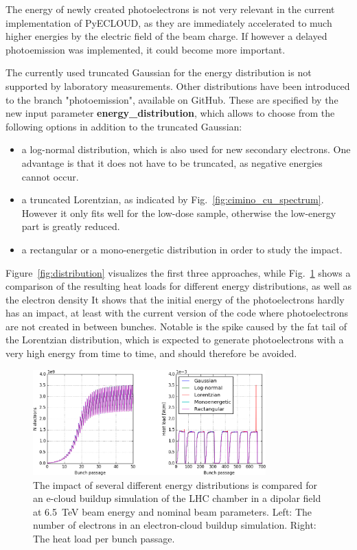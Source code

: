 The energy of newly created photoelectrons is not very relevant in the current implementation of PyECLOUD, as they are immediately accelerated to much higher energies by the electric field of the beam charge.
If however a delayed photoemission was implemented, it could become more important.

The currently used truncated Gaussian for the energy distribution is not supported by laboratory measurements.
Other distributions have been introduced to the branch "photoemission", available on GitHub.
These are specified by the new input parameter \textbf{energy\_distribution}, which allows to choose from the following options in addition to the truncated Gaussian:
\begin{itemize}
    \item a log-normal distribution, which is also used for new secondary electrons.
        One advantage is that it does not have to be truncated, as negative energies cannot occur.
    \item a truncated Lorentzian, as indicated by Fig.~\ref{fig:cimino_cu_spectrum}.
        However it only fits well for the low-dose sample, otherwise the low-energy part is greatly reduced.
    \item a rectangular or a mono-energetic distribution in order to study the impact.
\end{itemize}
Figure~\ref{fig:distribution} visualizes the first three approaches, while Fig.~\ref{fig:test_energy_dist} shows a comparison of the resulting heat loads for different energy distributions, as well as the electron density
It shows that the initial energy of the photoelectrons hardly has an impact, at least with the current version of the code where photoelectrons are not created in between bunches.
Notable is the spike caused by the fat tail of the Lorentzian distribution, which is expected to generate photoelectrons with a very high energy from time to time, and should therefore be avoided.

\begin{figure}[tbh]
    \centering
    \includegraphics[width=0.8\textwidth]{../plots/energy_distribution_impact.png}
    \caption{
        The impact of several different energy distributions is compared for an e-cloud buildup simulation of the LHC chamber in a dipolar field at 6.5~TeV beam energy and nominal beam parameters.
        Left: The number of electrons in an electron-cloud buildup simulation.
        Right: The heat load per bunch passage.
    }
    \label{fig:test_energy_dist}
\end{figure}

